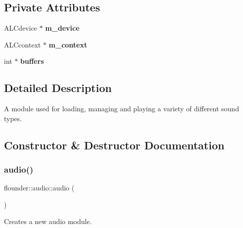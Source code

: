 \subsection*{Private Attributes}
\begin{DoxyCompactItemize}
\item 
\mbox{\label{classflounder_1_1audio_a6e577784668fbd39f2d6aa8e45bd2983}} 
A\+L\+Cdevice $\ast$ {\bfseries m\+\_\+device}
\item 
\mbox{\label{classflounder_1_1audio_a361e675d6029769f9a366354a3e1cb61}} 
A\+L\+Ccontext $\ast$ {\bfseries m\+\_\+context}
\item 
\mbox{\label{classflounder_1_1audio_a58379153a6620d70633e20b4660502ea}} 
int $\ast$ {\bfseries buffers}
\end{DoxyCompactItemize}


\subsection{Detailed Description}
A module used for loading, managing and playing a variety of different sound types. 



\subsection{Constructor \& Destructor Documentation}
\mbox{\label{classflounder_1_1audio_a0aabbb226f542847145d89adb1144c16}} 
\subsubsection{\texorpdfstring{audio()}{audio()}}
{\footnotesize\ttfamily flounder\+::audio\+::audio (\begin{DoxyParamCaption}{ }\end{DoxyParamCaption})}



Creates a new audio module. 

\mbox{\label{classflounder_1_1audio_afb4d3bbb9ae399385a3abfe6e4e6d7ee}} 
